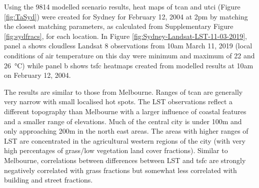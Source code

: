 \documentclass[final,3p,times,authoryear]{elsarticle}
\begin{document}
Using the 9814 modelled scenario results, heat maps of \gls{tcan} and \gls{utci} (Figure \ref{fig:TaSyd}) were created for Sydney for February 12, 2004 at 2pm by matching the closest matching parameters, as calculated from Supplementary Figure \ref{fig:sydfracs}, for each location. In Figure \ref{fig:Sydney-Landsat-LST-11-03-2019}, panel a shows cloudless Landsat 8 observations from 10am March 11, 2019 (local conditions of air temperature on this day were minimum and maximum of 22 and 26\SI{}{\degreeCelsius}) while panel b shows \gls{tsfc} heatmaps created from modelled results at 10am on February 12, 2004. 

The results are similar to those from Melbourne. Ranges of \gls{tcan} are generally very narrow with small localised hot spots. The LST observations reflect a different topography than Melbourne with a larger influence of coastal features and a smaller range of elevations. Much of the central city is under 100m and only approaching 200m in the north east areas. The areas with higher ranges of LST are concentrated in the agricultural western regions of the city (with very high percentages of grass/low vegetation land cover fractions). Similar to Melbourne, correlations between differences between LST and \gls{tsfc} are strongly negatively correlated with grass fractions but somewhat less correlated with building and street fractions.



\end{document}

